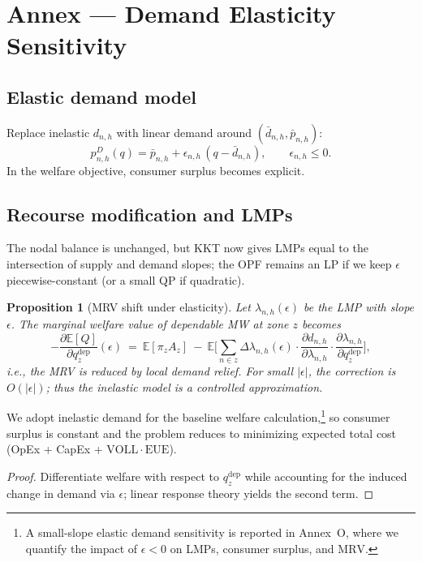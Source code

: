 \documentclass[11pt]{article}
\newcommand{\VOLL}{\ensuremath{\mathrm{VOLL}}}
\newcommand{\EUE}{\ensuremath{\mathrm{EUE}}}
\newcommand{\E}{\mathbb{E}}
\numberwithin{equation}{section}
\newtheorem{proposition}{Proposition}[section]
\theoremstyle{definition}
\theoremstyle{remark}
\begin{document}
\section{Annex  — Demand Elasticity Sensitivity}
\label{annex:O}

\subsection{ Elastic demand model}
Replace inelastic $d_{n,h}$ with linear demand around $(\bar d_{n,h},\bar p_{n,h})$:
\[
p_{n,h}^{D}(q)=\bar p_{n,h} + \epsilon_{n,h}\,(q-\bar d_{n,h}),\qquad \epsilon_{n,h}\le 0.
\]
In the welfare objective, consumer surplus becomes explicit.

\subsection{ Recourse modification and LMPs}
The nodal balance is unchanged, but KKT now gives LMPs equal to the intersection of supply and demand slopes; the OPF remains an LP if we keep $\epsilon$ piecewise-constant (or a small QP if quadratic).

\begin{proposition}[MRV shift under elasticity]
Let $\lambda_{n,h}(\epsilon)$ be the LMP with slope $\epsilon$. The marginal welfare value of dependable MW at zone $z$ becomes
\[
-\frac{\partial \E[Q]}{\partial q^{\mathrm{dep}}_{z}}(\epsilon) \ =\ \E[\pi_z A_z] \ -\ \E\Big[\sum_{n\in z}\Delta \lambda_{n,h}(\epsilon)\cdot \frac{\partial d_{n,h}}{\partial \lambda_{n,h}}\cdot \frac{\partial \lambda_{n,h}}{\partial q^{\mathrm{dep}}_{z}}\Big],
\]
i.e., the MRV is reduced by local demand relief. For small $|\epsilon|$, the correction is $O(|\epsilon|)$; thus the inelastic model is a controlled approximation.
\end{proposition}

We adopt inelastic demand for the baseline welfare calculation,\footnote{A small-slope elastic demand sensitivity is reported in Annex~O, where we quantify the impact of $\epsilon<0$ on LMPs, consumer surplus, and $\mathrm{MRV}$.} so consumer surplus is constant and the problem reduces to minimizing expected total cost (OpEx + CapEx + $\VOLL\cdot\EUE$).

\begin{proof}
Differentiate welfare with respect to $q^{\mathrm{dep}}_{z}$ while accounting for the induced change in demand via $\epsilon$; linear response theory yields the second term. 
\end{proof}
\end{document}
